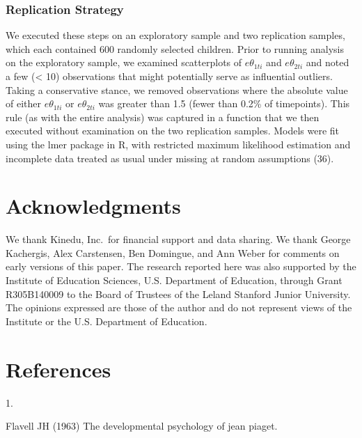 \documentclass[man]{apa7}
\newlength{\csllabelwidth}
\newcommand{\CSLLeftMargin}[1]{\parbox[t]{\csllabelwidth}{#1}}
\begin{document}
\hypertarget{replication-strategy}{%
\subsubsection*{Replication Strategy}\label{replication-strategy}}

We executed these steps on an exploratory sample and two replication
samples, which each contained 600 randomly selected children. Prior to
running analysis on the exploratory sample, we examined scatterplots of
\(e\theta_{1ti}\) and \(e\theta_{2ti}\) and noted a few (\textless{} 10)
observations that might potentially serve as influential outliers.
Taking a conservative stance, we removed observations where the absolute
value of either \(e\theta_{1ti}\) or \(e\theta_{2ti}\) was greater than
1.5 (fewer than 0.2\% of timepoints). This rule (as with the entire
analysis) was captured in a function that we then executed without
examination on the two replication samples. Models were fit using the
lmer package in R, with restricted maximum likelihood estimation and
incomplete data treated as usual under missing at random assumptions
(36).

\hypertarget{ack}{%
\section{Acknowledgments}\label{act}}
We thank Kinedu, Inc.~for financial support and data sharing. We thank
George Kachergis, Alex Carstensen, Ben Domingue, and Ann Weber for
comments on early versions of this paper. The research reported here was
also supported by the Institute of Education Sciences, U.S. Department of
Education, through Grant R305B140009 to the Board of Trustees of the
Leland Stanford Junior University. The opinions expressed are those of
the author and do not represent views of the Institute or the U.S.
Department of Education.

\setlength{\parindent}{-0.6in}
\setlength{\leftskip}{0.6in}
\setlength{\parskip}{6pt}
\noindent

\newpage

\section*{References}

\leavevmode\hypertarget{ref-flavell1963developmental}{}%
\CSLLeftMargin{1.}Flavell JH (1963) The developmental psychology of jean
piaget.
\end{document}
